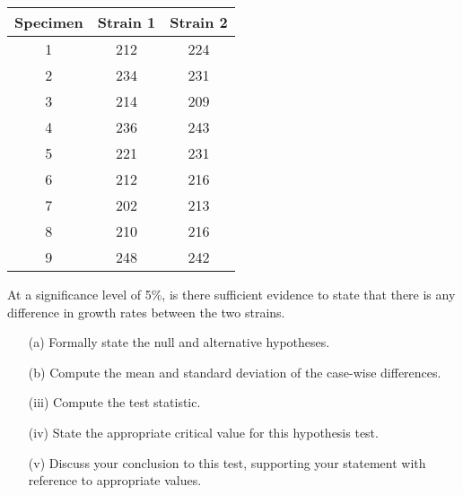\begin{center}
\begin{tabular}{|c|c|c|} \hline 
Specimen &Strain 1&Strain 2\\ \hline \hline
1 & 212 & 224 \\ \hline
2 & 234 & 231 \\ \hline
3 & 214 & 209 \\ \hline
4 & 236 & 243 \\ \hline
5 & 221 & 231 \\ \hline 
6 & 212 & 216 \\ \hline
7 & 202 & 213 \\ \hline 
8 & 210 & 216 \\ \hline
9 & 248 & 242 \\ \hline
\end{tabular} 
\end{center}
\noindent At a significance level of 5\%, is there sufficient evidence to state that there is any difference in growth rates between the two strains.




\begin{itemize}
\item[(a)] Formally state the null and alternative hypotheses.
\item[(b)]  Compute the mean and standard deviation of the case-wise differences.
\item[(iii)] Compute the test statistic.
\item[(iv)] State the appropriate critical value for this hypothesis test.
\item[(v)] Discuss your conclusion to this test, supporting your statement with reference to appropriate values.
\end{itemize}


